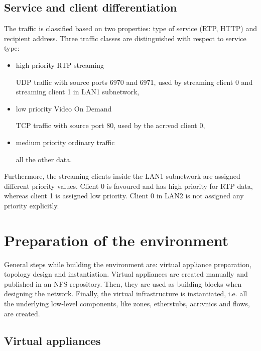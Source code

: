 \documentclass[11pt]{book}
\begin{document}
      \subsection{Service and client differentiation}
      \label{sub:uc:diff}

        The traffic is classified based on two properties: type of service (RTP, HTTP) and recipient address. Three
        traffic classes are distinguished with respect to service type:

        \begin{itemize}

          \item high priority RTP streaming

                UDP traffic with source ports 6970 and 6971, used by streaming client 0
                and streaming client 1 in LAN1 subnetwork,

          \item low priority Video On Demand
          
                TCP traffic with source port 80, used by the \gls{acr:vod} client 0,

          \item medium priority ordinary traffic
          
                all the other data.

        \end{itemize}

        Furthermore, the streaming clients inside the LAN1 subnetwork are assigned different priority values. Client 0 is
        favoured and has high priority for RTP data, whereas client 1 is assigned low priority. Client 0 in LAN2
        is not assigned any priority explicitly.


    \section{Preparation of the environment}
    \label{sec:uc:prep}

      General steps while building the environment are: virtual appliance preparation, topology design and
      instantiation. Virtual appliances are created manually and published in an NFS repository. Then, they are used as
      building blocks when designing the network. Finally, the virtual infrastructure is instantiated, i.e. all the
      underlying low-level components, like zones, etherstubs, \gls{acr:vnic}s and flows, are created.


      \subsection{Virtual appliances}
      \label{ssub:case:prep:va}
\end{document}
